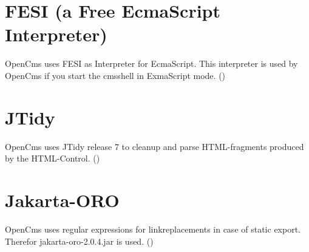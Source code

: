 \section{FESI (a Free EcmaScript Interpreter)}
OpenCms uses FESI as Interpreter for EcmaScript. This interpreter is used by OpenCms if you start the cmsshell in
ExmaScript mode.
()

\section{JTidy}
OpenCms uses JTidy release 7 to cleanup and parse HTML-fragments produced by the HTML-Control. 
()

\section{Jakarta-ORO}
OpenCms uses regular expressions for linkreplacements in case of static export. Therefor jakarta-oro-2.0.4.jar
is used.
()

